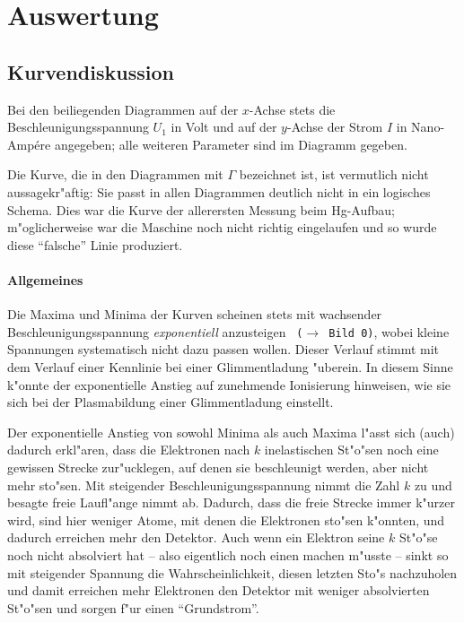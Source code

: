 \documentclass[a4paper,12pt]{article}
\newcommand{\abs}[0]{\bigskip\noindent}
\newcommand{\bild}[1]{\texttt{ ($\rightarrow$ Bild #1)}}
\begin{document}
\section*{Auswertung}
\label{sec:auswertung}


\subsection*{Kurvendiskussion}
\label{sec:kurvendiskussion}


Bei den beiliegenden Diagrammen auf der $x$-Achse stets die
Beschleunigungsspannung $U_1$ in Volt und auf der $y$-Achse der Strom
$I$ in Nano-Amp\'ere angegeben; alle weiteren Parameter sind im
Diagramm gegeben.

\abs
Die Kurve, die in den Diagrammen mit $\Gamma$ bezeichnet ist, ist
vermutlich nicht aussagekr"aftig: Sie passt in allen Diagrammen
deutlich nicht in ein logisches Schema. Dies war die Kurve der
allerersten Messung beim Hg-Aufbau; m"oglicherweise war die Maschine
noch nicht richtig eingelaufen und so wurde diese "`falsche"'
Linie produziert.


\paragraph{Allgemeines}
\label{sec:allgemeines}

Die Maxima und Minima der Kurven scheinen stets mit wachsender
Beschleunigungsspannung \emph{exponentiell} anzusteigen \bild 0, wobei
kleine Spannungen systematisch nicht dazu passen wollen. Dieser
Verlauf stimmt mit dem Verlauf einer Kennlinie bei einer
Glimmentladung "uberein. In diesem Sinne k"onnte der exponentielle
Anstieg auf zunehmende Ionisierung hinweisen, wie sie sich bei der
Plasmabildung einer Glimmentladung einstellt. 

Der exponentielle Anstieg von sowohl Minima als auch Maxima l"asst
sich (auch) dadurch erkl"aren, dass die Elektronen nach $k$
inelastischen St"o"sen noch eine gewissen Strecke zur"ucklegen, auf
denen sie beschleunigt werden, aber nicht mehr sto"sen. Mit steigender
Beschleunigungsspannung nimmt  die Zahl $k$ zu und besagte freie
Laufl"ange nimmt ab. Dadurch, dass die freie Strecke immer k"urzer
wird, sind hier weniger Atome, mit denen die Elektronen sto"sen
k"onnten, und dadurch erreichen mehr den Detektor. Auch wenn ein
Elektron seine $k$ St"o"se noch nicht absolviert hat -- also
eigentlich noch einen machen m"usste -- sinkt so mit steigender
Spannung die Wahrscheinlichkeit, diesen letzten Sto"s nachzuholen und
damit erreichen mehr Elektronen den Detektor mit weniger absolvierten
St"o"sen und sorgen f"ur einen "`Grundstrom"'.
\end{document}
